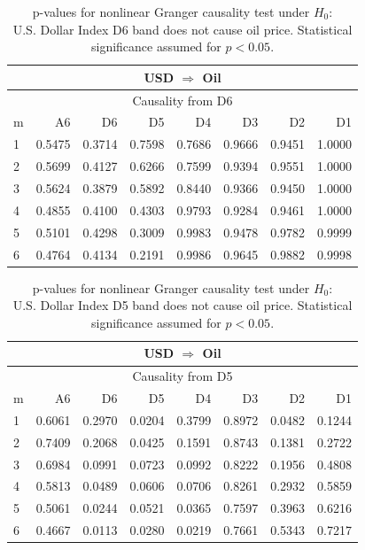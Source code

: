 %
%
\begin{table}[H]
\begin{center}
\begin{tabular}{l|r r r r r r r}
\hline\hline
\multicolumn{8}{c}{USD $\Rightarrow$ Oil}\\
\hline
\multicolumn{8}{c}{Causality from D6}\\
\hline\hline
m & A6 & D6 & D5 & D4 & D3 & D2 & D1 \\
\hline
1 & 0.5475 & 0.3714 & 0.7598 & 0.7686 & 0.9666 & 0.9451 & 1.0000 \\
2 & 0.5699 & 0.4127 & 0.6266 & 0.7599 & 0.9394 & 0.9551 & 1.0000 \\
3 & 0.5624 & 0.3879 & 0.5892 & 0.8440 & 0.9366 & 0.9450 & 1.0000 \\
4 & 0.4855 & 0.4100 & 0.4303 & 0.9793 & 0.9284 & 0.9461 & 1.0000 \\
5 & 0.5101 & 0.4298 & 0.3009 & 0.9983 & 0.9478 & 0.9782 & 0.9999 \\
6 & 0.4764 & 0.4134 & 0.2191 & 0.9986 & 0.9645 & 0.9882 & 0.9998 \\
\hline\hline
\end{tabular}
\caption{p-values for nonlinear Granger causality test under $H_0$:\\
U.S. Dollar Index D6 band does not cause oil price. Statistical significance assumed for $p<0.05$.}
\end{center}
\end{table}

%
%
\begin{table}[H]
\begin{center}
\begin{tabular}{l|r r r r r r r}
\hline\hline
\multicolumn{8}{c}{USD $\Rightarrow$ Oil}\\
\hline
\multicolumn{8}{c}{Causality from D5}\\
\hline\hline
m & A6 & D6 & D5 & D4 & D3 & D2 & D1 \\
\hline
1 & 0.6061 & 0.2970 & \cellcolor{mygreen}0.0204 & 0.3799 & 0.8972 & \cellcolor{mygreen}0.0482 & 0.1244 \\
2 & 0.7409 & 0.2068 & \cellcolor{mygreen}0.0425 & 0.1591 & 0.8743 & 0.1381 & 0.2722 \\
3 & 0.6984 & 0.0991 & 0.0723 & 0.0992 & 0.8222 & 0.1956 & 0.4808 \\
4 & 0.5813 & \cellcolor{mygreen}0.0489 & 0.0606 & 0.0706 & 0.8261 & 0.2932 & 0.5859 \\
5 & 0.5061 & \cellcolor{mygreen}0.0244 & 0.0521 & \cellcolor{mygreen}0.0365 & 0.7597 & 0.3963 & 0.6216 \\
6 & 0.4667 & \cellcolor{mygreen}0.0113 & \cellcolor{mygreen}0.0280 & \cellcolor{mygreen}0.0219 & 0.7661 & 0.5343 & 0.7217 \\
\hline\hline
\end{tabular}
\caption{p-values for nonlinear Granger causality test under $H_0$:\\
U.S. Dollar Index D5 band does not cause oil price. Statistical significance assumed for $p<0.05$.}
\end{center}
\end{table}

